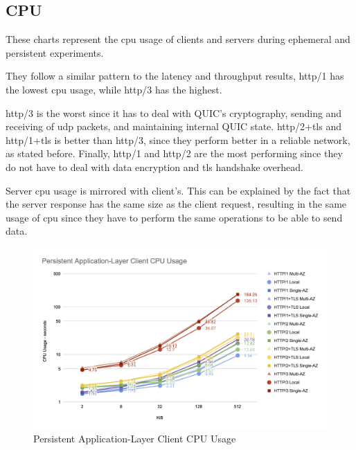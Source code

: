\subsection{CPU}

These charts represent the \gls{cpu} usage of clients and servers during ephemeral and persistent experiments.

They follow a similar pattern to the latency and throughput results, \gls{http}/1 has the lowest \gls{cpu} usage, while \gls{http}/3 has the highest.

\gls{http}/3 is the worst since it has to deal with QUIC’s cryptography, sending and receiving of \gls{udp} packets, and maintaining internal QUIC state. \gls{http}/2+\gls{tls} and \gls{http}/1+\gls{tls} is better than \gls{http}/3, since they perform better in a reliable network, as stated before. Finally, \gls{http}/1 and \gls{http}/2 are the most performing since they do not have to deal with data encryption and \gls{tls}  handshake overhead.

Server \gls{cpu} usage is mirrored with client’s. This can be explained by the fact that the server response has the same size as the client request, resulting in the same usage of \gls{cpu} since they have to perform the same operations to be able to send data.

\clearpage

\begin{figure}[h!]
    \centering
    \includegraphics[width=\linewidth]{figures/charts/Persistent Application-Layer Client CPU Usage.png}
    \caption{Persistent Application-Layer Client CPU Usage}
    \label{fig:persistent_client_application_cpu}
\end{figure}

